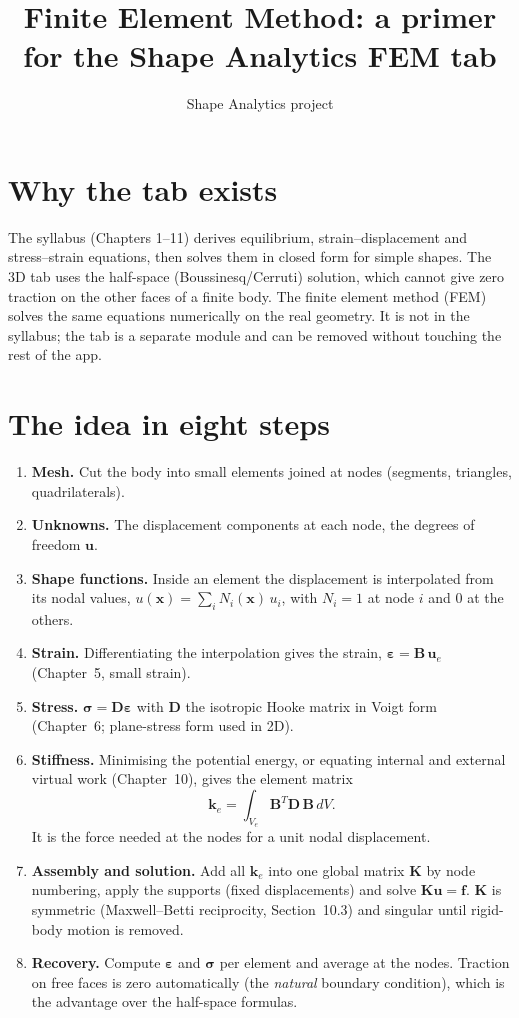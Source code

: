 \documentclass[11pt,a4paper]{article}
\title{Finite Element Method: a primer for the Shape Analytics FEM tab}
\author{Shape Analytics project}
\date{}
\begin{document}
\maketitle

\section{Why the tab exists}
The syllabus (Chapters 1--11) derives equilibrium, strain--displacement and stress--strain equations, then solves them in closed form for simple shapes. The 3D tab uses the half-space (Boussinesq/Cerruti) solution, which cannot give zero traction on the other faces of a finite body. The finite element method (FEM) solves the same equations numerically on the real geometry. It is not in the syllabus; the tab is a separate module and can be removed without touching the rest of the app.

\section{The idea in eight steps}
\begin{enumerate}
\item \textbf{Mesh.} Cut the body into small elements joined at nodes (segments, triangles, quadrilaterals).
\item \textbf{Unknowns.} The displacement components at each node, the degrees of freedom $\mathbf{u}$.
\item \textbf{Shape functions.} Inside an element the displacement is interpolated from its nodal values, $u(\mathbf{x})=\sum_i N_i(\mathbf{x})\,u_i$, with $N_i=1$ at node $i$ and $0$ at the others.
\item \textbf{Strain.} Differentiating the interpolation gives the strain, $\boldsymbol{\varepsilon}=\mathbf{B}\,\mathbf{u}_e$ (Chapter~5, small strain).
\item \textbf{Stress.} $\boldsymbol{\sigma}=\mathbf{D}\boldsymbol{\varepsilon}$ with $\mathbf{D}$ the isotropic Hooke matrix in Voigt form (Chapter~6; plane-stress form used in 2D).
\item \textbf{Stiffness.} Minimising the potential energy, or equating internal and external virtual work (Chapter~10), gives the element matrix
\[ \mathbf{k}_e=\int_{V_e}\mathbf{B}^{T}\mathbf{D}\,\mathbf{B}\,dV. \]
It is the force needed at the nodes for a unit nodal displacement.
\item \textbf{Assembly and solution.} Add all $\mathbf{k}_e$ into one global matrix $\mathbf{K}$ by node numbering, apply the supports (fixed displacements) and solve $\mathbf{K}\mathbf{u}=\mathbf{f}$. $\mathbf{K}$ is symmetric (Maxwell--Betti reciprocity, Section~10.3) and singular until rigid-body motion is removed.
\item \textbf{Recovery.} Compute $\boldsymbol\varepsilon$ and $\boldsymbol\sigma$ per element and average at the nodes. Traction on free faces is zero automatically (the \emph{natural} boundary condition), which is the advantage over the half-space formulas.
\end{enumerate}
\end{document}
